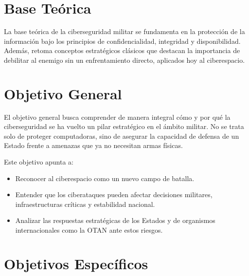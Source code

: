 \documentclass[12pt]{article}
\begin{document}
\section{Base Teórica}
La base teórica de la ciberseguridad militar se fundamenta en la protección de la información bajo los principios de confidencialidad, integridad y disponibilidad. Además, retoma conceptos estratégicos clásicos que destacan la importancia de debilitar al enemigo sin un enfrentamiento directo, aplicados hoy al ciberespacio.

\section{Objetivo General}
El objetivo general busca comprender de manera integral cómo y por qué la ciberseguridad se ha vuelto un pilar estratégico en el ámbito militar. No se trata solo de proteger computadoras, sino de asegurar la capacidad de defensa de un Estado frente a amenazas que ya no necesitan armas físicas.

Este objetivo apunta a:
\begin{itemize}
    \item Reconocer al ciberespacio como un nuevo campo de batalla.
    \item Entender que los ciberataques pueden afectar decisiones militares, infraestructuras críticas y estabilidad nacional.
    \item Analizar las respuestas estratégicas de los Estados y de organismos internacionales como la OTAN ante estos riesgos.
\end{itemize}

\section{Objetivos Específicos}
\end{document}
